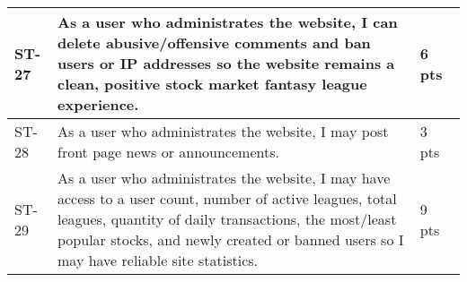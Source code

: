 \begin{longtable}{|p{0.5in}|p{4.7in}|p{0.5in}|}
ST-27&As a user who administrates the website, I can delete abusive/offensive comments and ban users or IP addresses so the website remains a clean, positive stock market fantasy league experience.&6 pts  \\ \hline 
ST-28&As a user who administrates the website, I may post front page news or announcements.&3 pts  \\ \hline 
ST-29&As a user who administrates the website, I may have access to a user count, number of active leagues, total leagues, quantity of daily transactions, the most/least popular stocks, and newly created or banned users so I may have reliable site statistics. &9 pts \\ \hline 
\end{longtable}